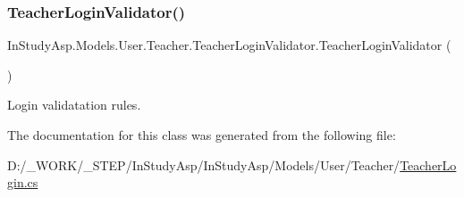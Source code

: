 \subsubsection{\texorpdfstring{Teacher\+Login\+Validator()}{TeacherLoginValidator()}}
{\footnotesize\ttfamily In\+Study\+Asp.\+Models.\+User.\+Teacher.\+Teacher\+Login\+Validator.\+Teacher\+Login\+Validator (\begin{DoxyParamCaption}{ }\end{DoxyParamCaption})}



Login validatation rules. 



The documentation for this class was generated from the following file\+:\begin{DoxyCompactItemize}
\item 
D\+:/\+\_\+\+W\+O\+R\+K/\+\_\+\+S\+T\+E\+P/\+In\+Study\+Asp/\+In\+Study\+Asp/\+Models/\+User/\+Teacher/\hyperlink{_teacher_login_8cs}{Teacher\+Login.\+cs}\end{DoxyCompactItemize}
